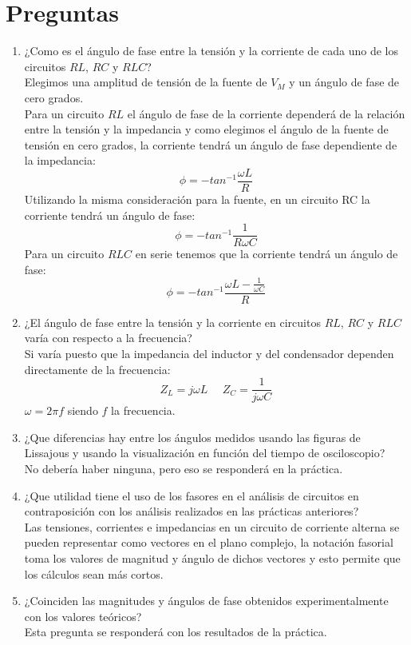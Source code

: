 \documentclass[twocolumn]{IEEEtran}
\begin{document}
\section{Preguntas}
\begin{enumerate}
 \item ¿Como es el ángulo de fase entre la tensión y la corriente de cada uno de los circuitos $RL$, $RC$ y $RLC$?\\
Elegimos una amplitud de tensión de la fuente de $V_M$ y un ángulo de fase de cero grados.\\
Para un circuito $RL$ el ángulo de fase de la corriente dependerá de la relación entre la tensión y la impedancia y como elegimos el ángulo de la fuente de tensión en cero grados, la corriente tendrá un ángulo de fase dependiente de la impedancia:
\begin{equation}
 \phi = -tan^{-1} \frac{\omega L}{R}
\label{ecu34}
\end{equation}
Utilizando la misma consideración para la fuente, en un circuito RC la corriente tendrá un ángulo de fase:
\begin{equation}
 \phi  =  - ta{n^{ - 1}}\frac{1}{{R\omega C}}
\label{ecu35}
\end{equation}
Para un circuito $RLC$ en serie tenemos que la corriente tendrá un ángulo de fase:
\begin{equation}
 \phi  =  - ta{n^{ - 1}}\frac{{\omega L - \frac{1}{{\omega C}}}}{R}
\label{ecu36}
\end{equation}

 \item ¿El ángulo de fase entre la tensión y la corriente en circuitos $RL$, $RC$ y $RLC$ varía con respecto a la frecuencia?\\
Si varía puesto que la impedancia del inductor y del condensador dependen directamente de la frecuencia:
\begin{equation}
 {Z_L} = j\omega L \ \ \ \ \ \ {Z_C} = \frac{1}{{j\omega C}}
\label{ecu37}
\end{equation}
\noindent
$\omega=2 \pi f$ siendo $f$ la frecuencia.

 \item ¿Que diferencias hay entre los ángulos medidos usando las figuras de Lissajous y usando la visualización en función del tiempo de osciloscopio?\\
No debería haber ninguna, pero eso se responderá en la práctica.
 \item ¿Que utilidad tiene el uso de los fasores en el análisis de circuitos en contraposición con los análisis realizados en las prácticas anteriores?\\
Las tensiones, corrientes e impedancias en un circuito de corriente alterna se pueden representar como vectores en el plano complejo, la notación fasorial toma los valores de magnitud y ángulo de dichos vectores y esto permite que los cálculos sean más cortos.
 \item ¿Coinciden las magnitudes y ángulos de fase obtenidos experimentalmente con los valores teóricos?\\
Esta pregunta se responderá con los resultados de la práctica.
\end{enumerate}
\end{document}
